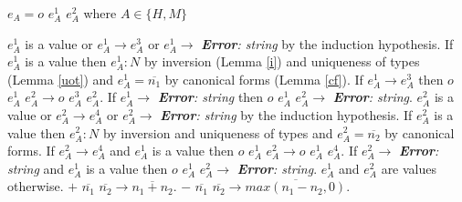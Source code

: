 \begin{case}

$e_{A}=o$ $e_{A}^{1}$ $e_{A}^{2}$ where $A\in\lbrace H,M\rbrace$

$e_{A}^{1}$ is a value or $e_{A}^{1}\rightarrow e_{A}^{3}$ or $e_{A}^{1}\rightarrow$ \emph{\textbf{Error}: string} by the induction hypothesis.  If $e_{A}^{1}$ is a value then $e_{A}^{1}:N$ by inversion (Lemma \ref{i}) and uniqueness of types (Lemma \ref{uot}) and $e_{A}^{1}=\overline{n_{1}}$ by canonical forms (Lemma \ref{cf}).  If $e_{A}^{1}\rightarrow e_{A}^{3}$ then $o$ $e_{A}^{1}$ $e_{A}^{2}\rightarrow o$ $e_{A}^{3}$ $e_{A}^{2}$.  If $e_{A}^{1}\rightarrow$ \emph{\textbf{Error}: string} then $o$ $e_{A}^{1}$ $e_{A}^{2}\rightarrow$ \emph{\textbf{Error}: string}.  $e_{A}^{2}$ is a value or $e_{A}^{2}\rightarrow e_{A}^{4}$ or $e_{A}^{2}\rightarrow$ \emph{\textbf{Error}: string} by the induction hypothesis.  If $e_{A}^{2}$ is a value then $e_{A}^{2}:N$ by inversion and uniqueness of types and $e_{A}^{2}=\overline{n_{2}}$ by canonical forms.  If $e_{A}^{2}\rightarrow e_{A}^{4}$ and $e_{A}^{1}$ is a value then $o$ $e_{A}^{1}$ $e_{A}^{2}\rightarrow o$ $e_{A}^{1}$ $e_{A}^{4}$.  If $e_{A}^{2}\rightarrow$ \emph{\textbf{Error}: string} and $e_{A}^{1}$ is a value then $o$ $e_{A}^{1}$ $e_{A}^{2}\rightarrow$ \emph{\textbf{Error}: string}.  $e_{A}^{1}$ and $e_{A}^{2}$ are values otherwise.  $+$ $\overline{n_{1}}$ $\overline{n_{2}}\rightarrow\overline{n_{1}+n_{2}}$.  $-$ $\overline{n_{1}}$ $\overline{n_{2}}\rightarrow\overline{max(n_{1}-n_{2},0)}$.

\end{case}